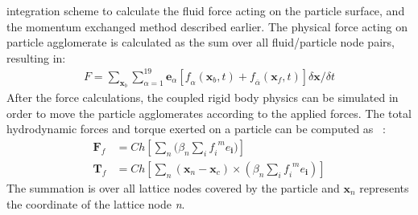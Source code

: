 integration scheme to calculate the fluid force acting on the particle surface, 
and the momentum exchanged method described earlier. The physical force acting 
on particle agglomerate is calculated as the sum over all fluid/particle node 
pairs, resulting in: 
%
\begin{align}
\mathit{F} = 
\sum\limits_{\mathbf{x}_{b}}\sum\limits_{\alpha=1}^{19}{\mathbf{e}_{\alpha}[\mathit{f}_{\alpha}(\mathbf{x}_{b},t)+\mathit{f}_{\overline{\alpha}}(\mathbf{x}_{f},t)]
 \delta \mathbf{x} / \delta t}
\end{align}
%
After the force calculations, the coupled rigid body physics can be simulated 
in order to move the particle agglomerates according to the applied forces. The 
total hydrodynamic forces and torque exerted on a particle can be computed as 
~\citep{Cook2004, Noble1998}:
%
\begin{align}
\mathbf{F}_{f} & = \mathit{Ch}[\sum\limits_{\mathit{n}}{(\beta_{\mathit{n}} 
\sum\limits_{\mathit{i}}{\mathit{f_i}^{\mathit{ m}}\mathbf{\mathit{e}_i}}})] \\ 
\mathbf{T}_{f} & = 
\mathit{Ch}[\sum\limits_{\mathit{n}}{(\mathbf{x}_{\mathit{n}}-\mathbf{x}_{\mathit{c}})
 \times (\beta_{\mathit{n}} \sum\limits_{\mathit{i}}{\mathit{f_i}^{\mathit{ 
m}}\mathbf{\mathit{e}_i}})}]
\end{align}
%
The summation is over all lattice nodes covered by the particle and 
$\mathbf{x}_{\mathit{n}}$ represents the coordinate of the lattice node 
\textit{n}.
%
